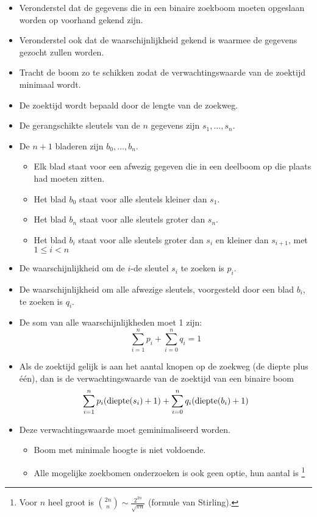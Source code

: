 \begin{itemize}
    \item Veronderstel dat de gegevens die in een binaire zoekboom moeten opgeslaan worden op voorhand gekend zijn.
    \item Veronderstel ook dat de waarschijnlijkheid gekend is waarmee de gegevens gezocht zullen worden.
    \item Tracht de boom zo te schikken zodat de verwachtingswaarde van de zoektijd minimaal wordt.
    \item De zoektijd wordt bepaald door de lengte van de zoekweg.
    \item De gerangschikte sleutels van de $n$ gegevens zijn $s_1, \dots, s_n$.
    \item De $n + 1$ bladeren zijn $b_0, \dots, b_n$.
    \begin{itemize}
        \item Elk blad staat voor een afwezig gegeven die in een deelboom op die plaats had moeten zitten.
        \item Het blad $b_0$ staat voor alle sleutels kleiner dan $s_1$.
        \item Het blad $b_n$ staat voor alle sleutels groter dan $s_n$.
        \item Het blad $b_i$ staat voor alle sleutels groter dan $s_i$ en kleiner dan $s_{i +1}$, met $1 \leq i < n$
    \end{itemize}
    \item De waarschijnlijkheid om de $i$-de sleutel $s_i$ te zoeken is $p_i$. 
    \item De waarschijnlijkheid om alle afwezige sleutels, voorgesteld door een blad $b_i$, te zoeken is $q_i$.
    \item De som van alle waarschijnlijkheden moet 1 zijn:
    $$\sum_{i = 1}^n p_i + \sum_{i = 0}^n q_i = 1$$
    \item Als de zoektijd gelijk is aan het aantal knopen op de zoekweg (de diepte plus één), dan is de verwachtingswaarde van de zoektijd van een binaire boom
    $$\sum_{i = 1}^n p_i (\hbox{diepte}(s_i) + 1) + \sum_{i = 0}^n q_i (\hbox{diepte}(b_i) + 1)$$
    \item Deze verwachtingswaarde moet geminimaliseerd worden.
    \begin{itemize}
        \item Boom met minimale hoogte is niet voldoende.
        \item Alle mogelijke zoekbomen onderzoeken is ook geen optie, hun aantal is \footnote{Voor $n$ heel groot is $\binom{2n}{n} \sim \frac{2^{2n}}{\sqrt{\pi n}}$ (formule van Stirling).}

\end{itemize}
\end{itemize}
